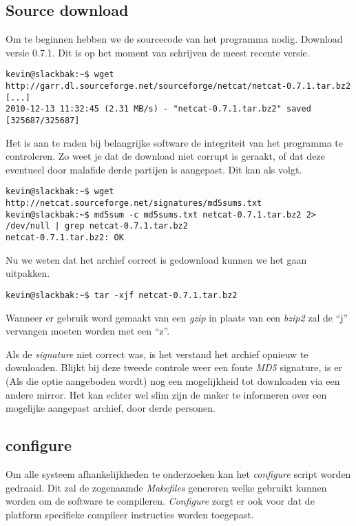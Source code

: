 \subsection{Source download}
Om te beginnen hebben we de sourcecode van het programma nodig. Download versie 0.7.1. Dit is op het moment van schrijven de meest recente versie. 
\begin{lstlisting}
kevin@slackbak:~$ wget http://garr.dl.sourceforge.net/sourceforge/netcat/netcat-0.7.1.tar.bz2
[...]
2010-12-13 11:32:45 (2.31 MB/s) - "netcat-0.7.1.tar.bz2" saved [325687/325687]

\end{lstlisting}%
Het is aan te raden bij belangrijke software de integriteit van het programma te controleren. Zo weet je dat de download niet corrupt is geraakt, of dat deze eventueel door malafide derde partijen is aangepast. Dit kan als volgt. 
\begin{lstlisting}
kevin@slackbak:~$ wget http://netcat.sourceforge.net/signatures/md5sums.txt
kevin@slackbak:~$ md5sum -c md5sums.txt netcat-0.7.1.tar.bz2 2> /dev/null | grep netcat-0.7.1.tar.bz2
netcat-0.7.1.tar.bz2: OK
\end{lstlisting}
Nu we weten dat het archief correct is gedownload kunnen we het gaan uitpakken. 
\begin{lstlisting}
kevin@slackbak:~$ tar -xjf netcat-0.7.1.tar.bz2
\end{lstlisting}%
Wanneer er gebruik word gemaakt van een \emph{gzip} in plaats van een \emph{bzip2} zal de ``j'' vervangen moeten worden met een ``z''.

Als de \emph{signature} niet correct was, is het verstand het archief opnieuw te downloaden. Blijkt bij deze tweede controle weer een foute \emph{MD5} signature, is er (Als die optie aangeboden wordt) nog een mogelijkheid tot downloaden via een andere mirror. Het kan echter wel slim zijn de maker te informeren over een mogelijke aangepast archief, door derde personen.

\subsection{configure}
Om alle systeem afhankelijkheden te onderzoeken kan het \emph{configure} script worden gedraaid. Dit zal de zogenaamde \emph{Makefiles} genereren welke gebruikt kunnen worden om de software te compileren. \emph{Configure} zorgt er ook voor dat de platform specifieke compileer instructies worden toegepast. 

